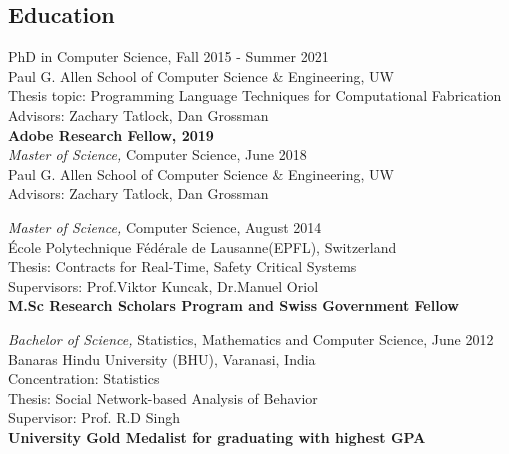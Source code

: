 \documentclass[margin, 10pt]{res} %
\begin{document}
\begin{resume}
\section{Education}

PhD in Computer Science, Fall 2015 - Summer 2021 \\
Paul G. Allen School of Computer Science \& Engineering, UW \\
Thesis topic: Programming Language Techniques for Computational Fabrication \\
Advisors: Zachary Tatlock, Dan Grossman\\
\textbf{Adobe Research Fellow, 2019} \\

{\sl Master of Science,} Computer Science, June 2018 \\
Paul G. Allen School of Computer Science \& Engineering, UW \\
Advisors: Zachary Tatlock, Dan Grossman

{\sl Master of Science,} Computer Science, August 2014 \\
\'{E}cole Polytechnique F\'{e}d\'{e}rale de Lausanne(EPFL), Switzerland \\
Thesis: Contracts for Real-Time, Safety Critical Systems \\Supervisors: Prof.Viktor Kuncak, Dr.Manuel Oriol\\
\textbf{M.Sc Research Scholars Program and Swiss Government Fellow}

{\sl Bachelor of Science,} Statistics, Mathematics and Computer Science, June 2012 \\
Banaras Hindu University (BHU), Varanasi, India \\
Concentration: Statistics \\
Thesis: Social Network-based Analysis of Behavior \\ Supervisor: Prof. R.D Singh\\
\textbf{University Gold Medalist for graduating with highest GPA}


\end{resume}
\end{document}
